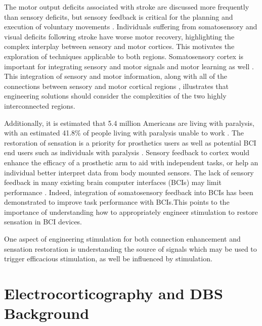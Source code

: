 The motor output deficits associated with stroke are discussed more frequently than sensory deficits, but sensory feedback is critical for the planning and execution of voluntary movements \cite{Bolognini2016}. Individuals suffering from somatosensory and visual deficits following stroke have worse motor recovery, highlighting the complex interplay between sensory and motor cortices. This motivates the exploration of techniques applicable to both regions. Somatosensory cortex is important for integrating sensory and motor signals and motor learning as well \cite{Borich2015}. This integration of sensory and motor information, along with all of the connections between sensory and motor cortical regions \cite{Ackerley2015}, illustrates that engineering solutions should consider the complexities of the two highly interconnected regions. 

Additionally, it is estimated that 5.4 million Americans are living with paralysis, with an estimated 41.8\% of people living with paralysis unable to work \cite{Foundation2013}. The restoration of sensation is a priority for prosthetics users \cite{Biddiss2007a} as well as potential BCI end users such as individuals with paralysis \cite{Collinger2013,Anderson2004}. Sensory feedback to cortex would enhance the efficacy of a prosthetic arm to aid with independent tasks, or help an individual better interpret data from body mounted sensors. The lack of sensory feedback in many existing brain computer interfaces (BCIs) may limit performance \cite{Delhaye2016,Bensmaia2014a}. Indeed, integration of somatosensory feedback into BCIs has been demonstrated to improve task performance with BCIs\cite{Pistohl2015,Dadarlat2015,Klaes2014,Suminski2010,Schiefer2016a}.This points to the importance of understanding how to appropriately engineer stimulation to restore sensation in BCI devices. 
 
One aspect of engineering stimulation for both connection enhancement and sensation restoration is understanding the source of signals which may be used to trigger efficacious stimulation, as well be influenced by stimulation. 

\section{Electrocorticography and DBS Background}

